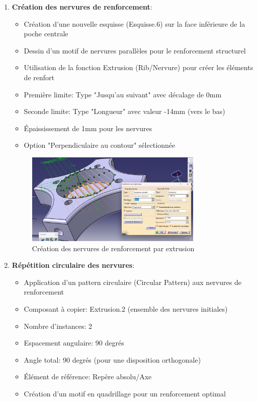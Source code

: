\documentclass[a4paper,12pt]{report}
\begin{document}
\begin{enumerate}
    \item \textbf{Création des nervures de renforcement}:
    \begin{itemize}
        \item Création d'une nouvelle esquisse (Esquisse.6) sur la face inférieure de la poche centrale
        \item Dessin d'un motif de nervures parallèles pour le renforcement structurel
        \item Utilisation de la fonction Extrusion (Rib/Nervure) pour créer les éléments de renfort
        \item Première limite: Type "Jusqu'au suivant" avec décalage de 0mm
        \item Seconde limite: Type "Longueur" avec valeur -14mm (vers le bas)
        \item Épaississement de 1mm pour les nervures
        \item Option "Perpendiculaire au contour" sélectionnée
    \end{itemize}
    
    \begin{figure}[H]
        \centering
        \includegraphics[width=0.8\textwidth]{images/nervures_renforcement.png}
        \caption{Création des nervures de renforcement par extrusion}
        \label{fig:nervures_renforcement}
    \end{figure}
    
    \item \textbf{Répétition circulaire des nervures}:
    \begin{itemize}
        \item Application d'un pattern circulaire (Circular Pattern) aux nervures de renforcement
        \item Composant à copier: Extrusion.2 (ensemble des nervures initiales)
        \item Nombre d'instances: 2
        \item Espacement angulaire: 90 degrés
        \item Angle total: 90 degrés (pour une disposition orthogonale)
        \item Élément de référence: Repère absolu/Axe
        \item Création d'un motif en quadrillage pour un renforcement optimal
    \end{itemize}
    

\end{enumerate}
\end{document}
